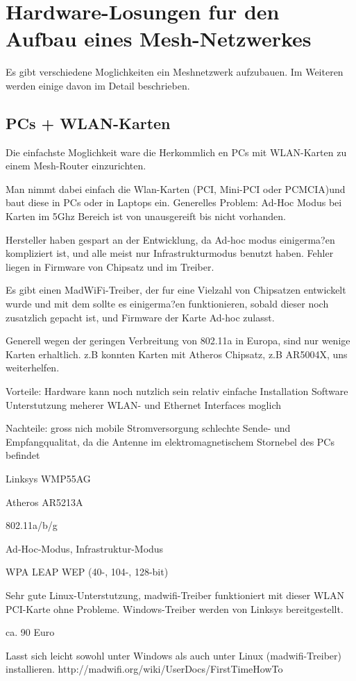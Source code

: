 \section{Hardware-Losungen fur den Aufbau eines Mesh-Netzwerkes}


Es gibt verschiedene Moglichkeiten ein Meshnetzwerk aufzubauen. Im Weiteren werden einige davon im Detail beschrieben. 

\subsection{PCs + WLAN-Karten}

Die einfachste Moglichkeit ware die Herkommlich en PCs mit WLAN-Karten zu einem Mesh-Router einzurichten. 

Man nimmt dabei einfach die Wlan-Karten (PCI, Mini-PCI oder PCMCIA)und baut diese in PCs oder in Laptops ein. 
Generelles Problem: 
 Ad-Hoc Modus bei Karten im 5Ghz Bereich ist von unausgereift bis nicht vorhanden. 

Hersteller haben gespart an der Entwicklung, da Ad-hoc modus einigerma?en kompliziert ist, und alle meist nur Infrastrukturmodus benutzt haben. Fehler liegen in Firmware von Chipsatz und im Treiber. 

Es gibt einen MadWiFi-Treiber, der fur eine Vielzahl von Chipsatzen entwickelt wurde und mit dem sollte es einigerma?en funktionieren, sobald dieser noch zusatzlich gepacht ist, und Firmware der Karte Ad-hoc zulasst. 

Generell wegen der geringen Verbreitung von 802.11a in Europa, sind nur wenige Karten erhaltlich. z.B konnten Karten mit Atheros Chipsatz, z.B AR5004X, uns weiterhelfen. 

Vorteile: 
Hardware kann noch nutzlich sein 
relativ einfache Installation 
Software Unterstutzung 
meherer WLAN- und Ethernet Interfaces moglich 

Nachteile: 
gross 
nich mobile 
Stromversorgung 
schlechte Sende- und Empfangqualitat, da die Antenne im elektromagnetischem Stornebel des PCs befindet 

\begin{wlandevice}{Linksys WMP55AG}

\wlanchipset
Atheros AR5213A

\wlanieeestandard
802.11a/b/g

\wlanmode
Ad-Hoc-Modus, Infrastruktur-Modus

\wlansecurity
 WPA
 LEAP
 WEP (40-, 104-, 128-bit)

\wlandriver
 Sehr gute Linux-Unterstutzung, madwifi-Treiber funktioniert
 mit dieser WLAN PCI-Karte ohne Probleme.
 Windows-Treiber werden von Linksys bereitgestellt.

\wlanprice
 ca. 90 Euro

\wlaninstall
 Lasst sich leicht sowohl unter Windows als auch unter Linux (madwifi-Treiber) installieren.
 http://madwifi.org/wiki/UserDocs/FirstTimeHowTo

 \end{wlandevice}
